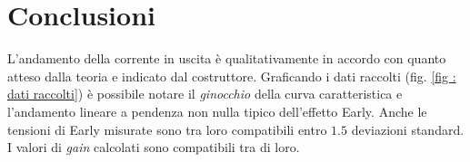 \section{Conclusioni}\label{sec:conclusioni}
L'andamento della corrente in uscita è qualitativamente in accordo con quanto atteso dalla teoria e indicato dal costruttore.
Graficando i dati raccolti (fig. \ref{fig : dati raccolti}) è possibile notare il \emph{ginocchio} della curva caratteristica
e l'andamento lineare a pendenza non nulla tipico dell'effetto Early.
Anche le tensioni di Early misurate sono tra loro compatibili entro $1.5$ deviazioni standard.
I valori di \emph{gain} calcolati sono compatibili tra di loro.
\vspace{.5cm}
